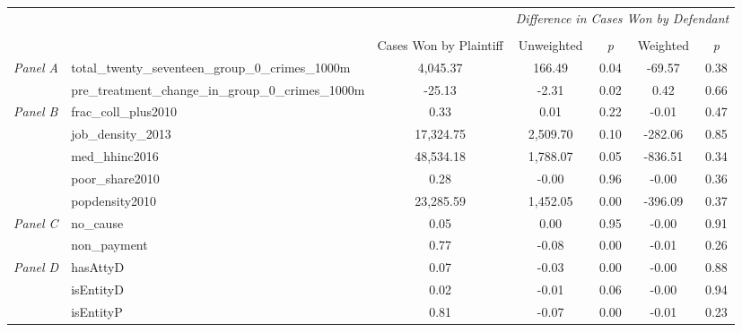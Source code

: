 \begin{tabular}{llccccc}
\toprule
 &  & \textit{} & \multicolumn{4}{c}{\textit{Difference in Cases Won by Defendant}} \\
\cline{4-7}
\\
 &  & Cases Won by Plaintiff & Unweighted & \emph{p} & Weighted & \emph{p} \\
\midrule
\multirow[c]{2}{3cm}{\textit{Panel A}} & total_twenty_seventeen_group_0_crimes_1000m & 4,045.37 & 166.49 & 0.04 & -69.57 & 0.38 \\
 & pre_treatment_change_in_group_0_crimes_1000m & -25.13 & -2.31 & 0.02 & 0.42 & 0.66 \\
\cline{1-7}
\multirow[c]{5}{3cm}{\textit{Panel B}} & frac_coll_plus2010 & 0.33 & 0.01 & 0.22 & -0.01 & 0.47 \\
 & job_density_2013 & 17,324.75 & 2,509.70 & 0.10 & -282.06 & 0.85 \\
 & med_hhinc2016 & 48,534.18 & 1,788.07 & 0.05 & -836.51 & 0.34 \\
 & poor_share2010 & 0.28 & -0.00 & 0.96 & -0.00 & 0.36 \\
 & popdensity2010 & 23,285.59 & 1,452.05 & 0.00 & -396.09 & 0.37 \\
\cline{1-7}
\multirow[c]{2}{3cm}{\textit{Panel C}} & no_cause & 0.05 & 0.00 & 0.95 & -0.00 & 0.91 \\
 & non_payment & 0.77 & -0.08 & 0.00 & -0.01 & 0.26 \\
\cline{1-7}
\multirow[c]{3}{3cm}{\textit{Panel D}} & hasAttyD & 0.07 & -0.03 & 0.00 & -0.00 & 0.88 \\
 & isEntityD & 0.02 & -0.01 & 0.06 & -0.00 & 0.94 \\
 & isEntityP & 0.81 & -0.07 & 0.00 & -0.01 & 0.23 \\
\cline{1-7}
\bottomrule
\end{tabular}
